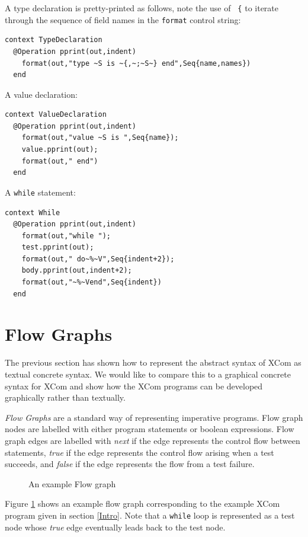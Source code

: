 \documentclass{article}
\begin{document}
A type declaration is pretty-printed as follows, note the use of {\tt ~\{}
to iterate through the sequence of field names in the {\tt format} control
string:
\begin{verbatim}
context TypeDeclaration
  @Operation pprint(out,indent)
    format(out,"type ~S is ~{,~;~S~} end",Seq{name,names})
  end
\end{verbatim}
A value declaration:
\begin{verbatim}
context ValueDeclaration
  @Operation pprint(out,indent)
    format(out,"value ~S is ",Seq{name});
    value.pprint(out);
    format(out," end")
  end
\end{verbatim}
A {\tt while} statement:
\begin{verbatim}
context While
  @Operation pprint(out,indent)
    format(out,"while ");
    test.pprint(out);
    format(out," do~%~V",Seq{indent+2});
    body.pprint(out,indent+2);
    format(out,"~%~Vend",Seq{indent})
  end
\end{verbatim}

\section{Flow Graphs}

The previous section has shown how to represent the abstract syntax of
XCom as textual concrete syntax. We would like to compare this to a
graphical concrete syntax for XCom and show how the XCom programs can be
developed graphically rather than textually.

{\it Flow Graphs} are a standard way of representing imperative programs.
Flow graph nodes are labelled with either program statements or boolean
expressions. Flow graph edges are labelled with {\it next} if the edge
represents the control flow between statements, {\it true} if the edge
represents the control flow arising when a test succeeds, and {\it false} 
if the edge represents the flow from a test failure.

\begin{figure}
\begin{center}
\end{center}
\caption{An example Flow graph}
\label{Program}
\end{figure}

Figure \ref{Program} shows an example flow graph corresponding to the
example XCom program given in section \ref{Intro}. Note that a {\tt while}
loop is represented as a test node whose {\it true} edge eventually
leads back to the test node.
\end{document}
